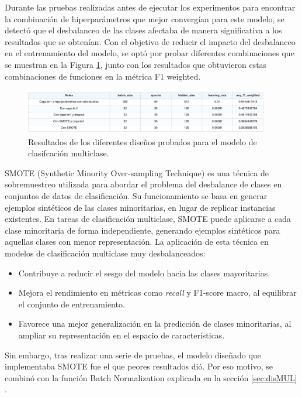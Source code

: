 Durante las pruebas realizadas antes de ejecutar los experimentos para encontrar la combinación de hiperparámetros que mejor convergían para este modelo, se detectó que el desbalanceo de las clases afectaba de manera significativa a los resultados que se obtenían. Con el objetivo de reducir el impacto del desbalanceo en el entrenamiento del modelo, se optó por probar diferentes combinaciones que se muestran en la Figura \ref{fig:MULpruebas}, junto con los resultados que obtuvieron estas combinaciones de funciones en la métrica F1 weighted.


\begin{figure}[H]
    \centering
    \includegraphics[width=0.95\textwidth]{./img/modelo/MULPRUEBAS.pdf}
    \caption{Resultados de los diferentes diseños probados para el modelo de clasifcación multiclase.}
    \label{fig:MULpruebas}
\end{figure}

SMOTE (Synthetic Minority Over-sampling Technique) es una técnica de sobremuestreo utilizada para abordar el problema del desbalance de clases en conjuntos de datos de clasificación. Su funcionamiento se basa en generar ejemplos sintéticos de las clases minoritarias, en lugar de replicar instancias existentes. En tareas de clasificación multiclase, SMOTE puede aplicarse a cada clase minoritaria de forma independiente, generando ejemplos sintéticos para aquellas clases con menor representación. La aplicación de esta técnica en modelos de clasificación multiclase muy desbalanceados:

\begin{itemize}
	\item Contribuye a reducir el sesgo del modelo hacia las clases mayoritarias.

	\item Mejora el rendimiento en métricas como \textit{recall} y F1-score macro, al equilibrar el conjunto de entrenamiento.

	\item Favorece una mejor generalización en la predicción de clases minoritarias, al ampliar su representación en el espacio de características.
\end{itemize}

Sin embargo, tras realizar una serie de pruebas, el modelo diseñado que implementaba  SMOTE fue el que peores resultados dió. Por eso motivo, se combinó con la función Batch Normalization explicada en la sección \ref{sec:disMUL} .

